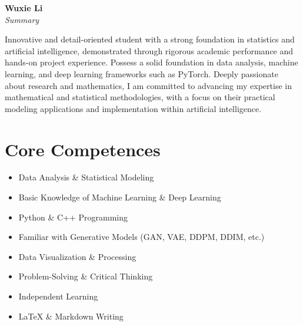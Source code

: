 \documentclass{article}
\begin{document}
\begin{center}
    \textbf{\LARGE Wuxie Li} \\
    \vspace{0.5em}
    \textit{Summary}
\end{center}

\noindent Innovative and detail-oriented student with a strong foundation in statistics and artificial intelligence, demonstrated through rigorous academic performance and hands-on project experience. Possess a solid foundation in data analysis, machine learning, and deep learning frameworks such as PyTorch. Deeply passionate about research and mathematics, I am committed to advancing my expertise in mathematical and statistical methodologies, with a focus on their practical modeling applications and implementation within artificial intelligence.

\section{Core Competences}
\begin{itemize}[leftmargin=1.5em]
    \item Data Analysis \& Statistical Modeling
    \item Basic Knowledge of Machine Learning \& Deep Learning
    \item Python \& C++ Programming
    \item Familiar with Generative Models (GAN, VAE, DDPM, DDIM, etc.)
    \item Data Visualization \& Processing
    \item Problem-Solving \& Critical Thinking
    \item Independent Learning
    \item LaTeX \& Markdown Writing
\end{itemize}
\end{document}
